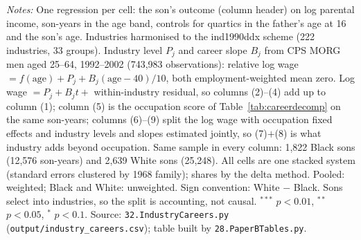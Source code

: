 \begin{table}[!htbp]
\begin{minipage}{\textwidth}\footnotesize \textit{Notes:} One regression per cell: the son's outcome (column header) on log parental income, son-years in the age band, controls for quartics in the father's age at 16 and the son's age. Industries harmonised to the ind1990ddx scheme (222 industries, 33 groups). Industry level $P_j$ and career slope $B_j$ from CPS MORG men aged 25--64, 1992--2002 (743,983 observations): relative log wage $= f(\text{age}) + P_j + B_j(\text{age}-40)/10$, both employment-weighted mean zero. Log wage $=P_j+B_j t+$ within-industry residual, so columns (2)--(4) add up to column (1); column (5) is the occupation score of Table~\ref{tab:careerdecomp} on the same son-years; columns (6)--(9) split the log wage with occupation fixed effects and industry levels and slopes estimated jointly, so (7)$+$(8) is what industry adds beyond occupation. Same sample in every column: 1,822 Black sons (12,576 son-years) and 2,639 White sons (25,248). All cells are one stacked system (standard errors clustered by 1968 family); shares by the delta method. Pooled: weighted; Black and White: unweighted. Sign convention: White $-$ Black. Sons select into industries, so the split is accounting, not causal. $^{***}$ $p<0.01$, $^{**}$ $p<0.05$, $^{*}$ $p<0.1$. Source: \texttt{32.IndustryCareers.py} (\texttt{output/industry\_careers.csv}); table built by \texttt{28.PaperBTables.py}.\end{minipage}
\end{table}
